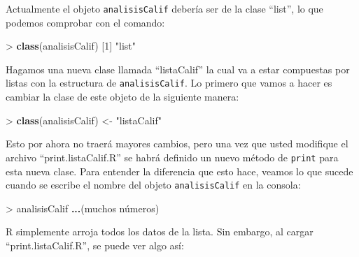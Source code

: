 \documentclass[]{article}
\newenvironment{Shaded}{}{}
\newcommand{\KeywordTok}[1]{\textcolor[rgb]{0.00,0.44,0.13}{\textbf{{#1}}}}
\newcommand{\DecValTok}[1]{\textcolor[rgb]{0.25,0.63,0.44}{{#1}}}
\newcommand{\StringTok}[1]{\textcolor[rgb]{0.25,0.44,0.63}{{#1}}}
\newcommand{\NormalTok}[1]{{#1}}
\begin{document}
Actualmente el objeto \texttt{analisisCalif} debería ser de la clase
``list'', lo que podemos comprobar con el comando:

\begin{Shaded}
\begin{Highlighting}[]
\NormalTok{> }\KeywordTok{class}\NormalTok{(analisisCalif)}
\NormalTok{[}\DecValTok{1}\NormalTok{] }\StringTok{"list"}
\end{Highlighting}
\end{Shaded}
Hagamos una nueva clase llamada ``listaCalif'' la cual va a estar
compuestas por listas con la estructura de \texttt{analisisCalif}. Lo
primero que vamos a hacer es cambiar la clase de este objeto de la
siguiente manera:

\begin{Shaded}
\begin{Highlighting}[]
\NormalTok{> }\KeywordTok{class}\NormalTok{(analisisCalif) <- }\StringTok{"listaCalif"}
\end{Highlighting}
\end{Shaded}
Esto por ahora no traerá mayores cambios, pero una vez que usted
modifique el archivo ``print.listaCalif.R'' se habrá definido un nuevo
método de \texttt{print} para esta nueva clase. Para entender la
diferencia que esto hace, veamos lo que sucede cuando se escribe el
nombre del objeto \texttt{analisisCalif} en la consola:

\begin{Shaded}
\begin{Highlighting}[]
\NormalTok{> analisisCalif}
\KeywordTok{...}\NormalTok{(muchos números)}
\end{Highlighting}
\end{Shaded}
R simplemente arroja todos los datos de la lista. Sin embargo, al cargar
``print.listaCalif.R'', se puede ver algo así:
\end{document}
